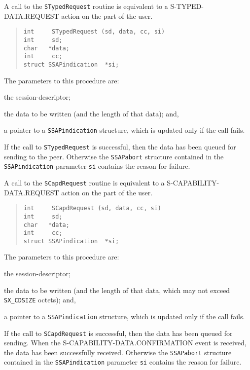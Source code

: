 A call to the \verb"STypedRequest" routine is equivalent to a
{\sf S-TYP\-ED-DA\-TA.RE\-QUEST\/} action on the part of the user.
\begin{quote}\small\begin{verbatim}
int     STypedRequest (sd, data, cc, si)
int     sd;
char   *data;
int     cc;
struct SSAPindication  *si;
\end{verbatim}\end{quote}
The parameters to this procedure are:
\begin{describe}
\item[\verb"sd":] the session-descriptor;

\item[\verb"data"/\verb"cc":] the data to be written (and the length of that
data);
and,

\item[\verb"si":] a pointer to a \verb"SSAPindication" structure, which is updated
only if the call fails.
\end{describe}
If  the call to \verb"STypedRequest" is successful,
then the data has been queued for sending to the peer.
Otherwise the \verb"SSAPabort" structure contained in
the \verb"SSAPindication" parameter
\verb"si" contains the reason for failure.

A call to the \verb"SCapdRequest" routine is equivalent to a {\sf
S-CAPABILITY-DATA.REQUEST\/} action on the part of the user.
\begin{quote}\small\begin{verbatim}
int     SCapdRequest (sd, data, cc, si)
int     sd;
char   *data;
int     cc;
struct SSAPindication  *si;
\end{verbatim}\end{quote}
The parameters to this procedure are:
\begin{describe}
\item[\verb"sd":] the session-descriptor;

\item[\verb"data"/\verb"cc":] the data to be written (and the length of that
data, which may not exceed \verb"SX_CDSIZE" octets);
and,

\item[\verb"si":] a pointer to a \verb"SSAPindication" structure, which is updated
only if the call fails.
\end{describe}
If the call to \verb"SCapdRequest" is successful,
then the data has been queued for sending.
When the {\sf S-CAPABILITY-DATA.CONFIRMATION\/} event is received,
the data has been successfully received.
Otherwise the \verb"SSAPabort" structure contained in
the \verb"SSAPindication" parameter
\verb"si" contains the reason for failure.

